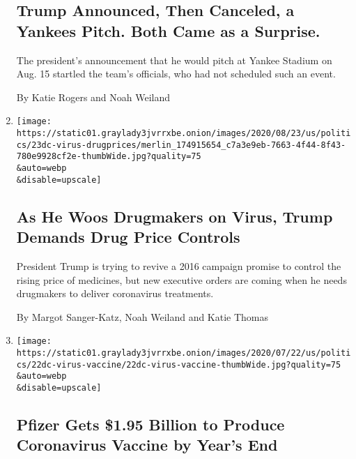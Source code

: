 \begin{enumerate}
  \hypertarget{trump-announced-then-canceled-a-yankees-pitch-both-came-as-a-surprise}{%
  \subsection{Trump Announced, Then Canceled, a Yankees Pitch. Both Came
  as a
  Surprise.}\label{trump-announced-then-canceled-a-yankees-pitch-both-came-as-a-surprise}}

  The president's announcement that he would pitch at Yankee Stadium on
  Aug. 15 startled the team's officials, who had not scheduled such an
  event.

  By Katie Rogers and Noah Weiland
\item
  \href{/2020/07/24/us/politics/trump-drug-prices-coronavirus.html}{}

  \texttt{[image: https://static01.graylady3jvrrxbe.onion/images/2020/08/23/us/politics/23dc-virus-drugprices/merlin\_174915654\_c7a3e9eb-7663-4f44-8f43-780e9928cf2e-thumbWide.jpg?quality=75\\\&auto=webp\\\&disable=upscale]}

  \hypertarget{as-he-woos-drugmakers-on-virus-trump-demands-drug-price-controls}{%
  \subsection{As He Woos Drugmakers on Virus, Trump Demands Drug Price
  Controls}\label{as-he-woos-drugmakers-on-virus-trump-demands-drug-price-controls}}

  President Trump is trying to revive a 2016 campaign promise to control
  the rising price of medicines, but new executive orders are coming
  when he needs drugmakers to deliver coronavirus treatments.

  By Margot Sanger-Katz, Noah Weiland and Katie Thomas
\item
  \href{/2020/07/22/us/politics/pfizer-coronavirus-vaccine.html}{}

  \texttt{[image: https://static01.graylady3jvrrxbe.onion/images/2020/07/22/us/politics/22dc-virus-vaccine/22dc-virus-vaccine-thumbWide.jpg?quality=75\\\&auto=webp\\\&disable=upscale]}

  \hypertarget{pfizer-gets-195-billion-to-produce-coronavirus-vaccine-by-years-end}{%
  \subsection{Pfizer Gets \$1.95 Billion to Produce Coronavirus Vaccine
  by Year's
  End}\label{pfizer-gets-195-billion-to-produce-coronavirus-vaccine-by-years-end}}


\end{enumerate}
